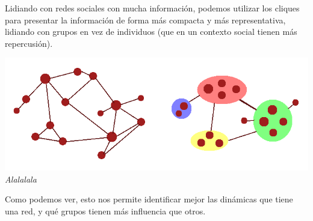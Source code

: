 Lidiando con redes sociales con mucha información, podemos utilizar los cliques para presentar la información de forma más compacta y más representativa, lidiando con grupos en vez de individuos (que en un contexto social tienen más repercusión). \\

\begin{center}
	\includegraphics[scale=0.9]{imgs/example.png}
	\textit{Alalalala}
\end{center}

Como podemos ver, esto nos permite identificar mejor las dinámicas que tiene una red, y qué grupos tienen más influencia que otros.